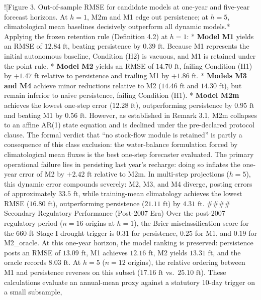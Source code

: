 \documentclass[11pt]{article}
\begin{document}
!{[}Figure 3. Out-of-sample RMSE for candidate models at one-year and
five-year forecast horizons. At \(h=1\), M2m and M1 edge out
persistence; at \(h=5\), climatological mean baselines decisively
outperform all dynamic models.* Applying the frozen retention rule
(Definition 4.2) at \(h=1\): * \textbf{Model M1} yields an RMSE of
\(12.84\text{ ft}\), beating persistence by \(0.39\text{ ft}\). Because
M1 represents the initial autonomous baseline, Condition (H2) is
vacuous, and M1 is retained under the point rule. * \textbf{Model M2}
yields an RMSE of \(14.70\text{ ft}\), failing Condition (H1) by
\(+1.47\text{ ft}\) relative to persistence and trailing M1 by
\(+1.86\text{ ft}\). * \textbf{Models M3 and M4} achieve minor
reductions relative to M2 (\(14.46\text{ ft}\) and \(14.30\text{ ft}\)),
but remain inferior to naive persistence, failing Condition (H1). *
\textbf{Model M2m} achieves the lowest one-step error
(\(12.28\text{ ft}\)), outperforming persistence by \(0.95\text{ ft}\)
and beating M1 by \(0.56\text{ ft}\). However, as established in Remark
3.1, M2m collapses to an affine AR(1) state equation and is declined
under the pre-declared protocol clause. The formal verdict that ``no
stock-flow module is retained'' is partly a consequence of this class
exclusion: the water-balance formulation forced by climatological mean
fluxes is the best one-step forecaster evaluated. The primary
operational failure lies in persisting last year's recharge: doing so
inflates the one-year error of M2 by \(+2.42\text{ ft}\) relative to
M2m. In multi-step projections (\(h=5\)), this dynamic error compounds
severely: M2, M3, and M4 diverge, posting errors of approximately
\(33.5\text{ ft}\), while training-mean climatology achieves the lowest
RMSE (\(16.80\text{ ft}\)), outperforming persistence
(\(21.11\text{ ft}\)) by \(4.31\text{ ft}\). \#\#\#\# Secondary
Regulatory Performance (Post-2007 Era) Over the post-2007 regulatory
period (\(n=16\) origins at \(h=1\)), the Brier misclassification score
for the 660-ft Stage I drought trigger is \(0.31\) for persistence,
\(0.25\) for M1, and \(0.19\) for M2\_oracle. At this one-year horizon,
the model ranking is preserved: persistence posts an RMSE of
\(13.09\text{ ft}\), M1 achieves \(12.16\text{ ft}\), M2 yields
\(13.31\text{ ft}\), and the oracle records \(8.03\text{ ft}\). At
\(h=5\) (\(n=12\) origins), the relative ordering between M1 and
persistence reverses on this subset (\(17.16\text{ ft}\)
vs.~\(25.10\text{ ft}\)). These calculations evaluate an annual-mean
proxy against a statutory 10-day trigger on a small subsample,
\end{document}
